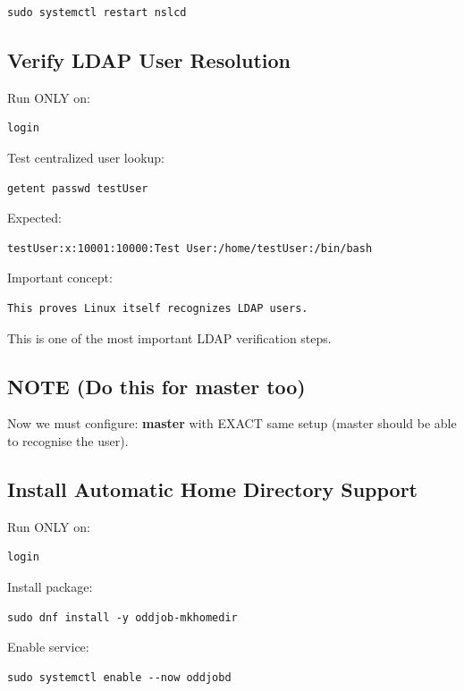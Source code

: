 \documentclass[11pt]{article}
\begin{document}
\begin{verbatim}
sudo systemctl restart nslcd
\end{verbatim}
\subsection{Verify LDAP User Resolution}
\label{sec:org95637ff}

Run ONLY on:

\begin{verbatim}
login
\end{verbatim}

Test centralized user lookup:

\begin{verbatim}
getent passwd testUser
\end{verbatim}

Expected:

\begin{verbatim}
testUser:x:10001:10000:Test User:/home/testUser:/bin/bash
\end{verbatim}

Important concept:

\begin{verbatim}
This proves Linux itself recognizes LDAP users.
\end{verbatim}

This is one of the most important LDAP verification steps.
\subsection{NOTE (Do this for master too)}
\label{sec:org38a30f9}
Now we must configure: \textbf{master} with EXACT same setup (master should be able to recognise the user).
\subsection{Install Automatic Home Directory Support}
\label{sec:orgd422fb5}

Run ONLY on:

\begin{verbatim}
login
\end{verbatim}

Install package:

\begin{verbatim}
sudo dnf install -y oddjob-mkhomedir
\end{verbatim}

Enable service:

\begin{verbatim}
sudo systemctl enable --now oddjobd
\end{verbatim}
\end{document}
